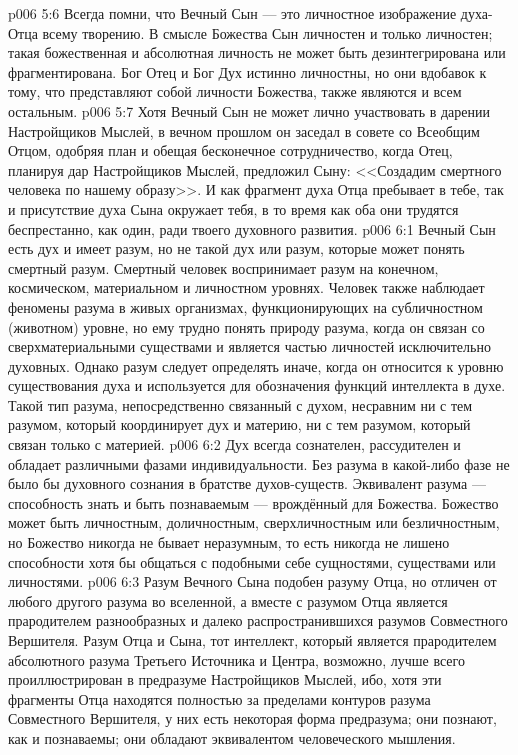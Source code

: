 \vs p006 5:6 Всегда помни, что Вечный Сын --- это личностное изображение духа\hyp{}Отца всему творению. В смысле Божества Сын личностен и только личностен; такая божественная и абсолютная личность не может быть дезинтегрирована или фрагментирована. Бог Отец и Бог Дух истинно личностны, но они вдобавок к тому, что представляют собой личности Божества, также являются и всем остальным.
\vs p006 5:7 Хотя Вечный Сын не может лично участвовать в дарении Настройщиков Мыслей, в вечном прошлом он заседал в совете со Всеобщим Отцом, одобряя план и обещая бесконечное сотрудничество, когда Отец, планируя дар Настройщиков Мыслей, предложил Сыну: <<Создадим смертного человека по нашему образу>>. И как фрагмент духа Отца пребывает в тебе, так и присутствие духа Сына окружает тебя, в то время как оба они трудятся беспрестанно, как один, ради твоего духовного развития.
\vs p006 6:1 Вечный Сын есть дух и имеет разум, но не такой дух или разум, которые может понять смертный разум. Смертный человек воспринимает разум на конечном, космическом, материальном и личностном уровнях. Человек также наблюдает феномены разума в живых организмах, функционирующих на субличностном (животном) уровне, но ему трудно понять природу разума, когда он связан со сверхматериальными существами и является частью личностей исключительно духовных. Однако разум следует определять иначе, когда он относится к уровню существования духа и используется для обозначения функций интеллекта в духе. Такой тип разума, непосредственно связанный с духом, несравним ни с тем разумом, который координирует дух и материю, ни с тем разумом, который связан только с материей.
\vs p006 6:2 Дух всегда сознателен, рассудителен и обладает различными фазами индивидуальности. Без разума в какой\hyp{}либо фазе не было бы духовного сознания в братстве духов\hyp{}существ. Эквивалент разума --- способность знать и быть познаваемым --- врождённый для Божества. Божество может быть личностным, доличностным, сверхличностным или безличностным, но Божество никогда не бывает неразумным, то есть никогда не лишено способности хотя бы общаться с подобными себе сущностями, существами или личностями.
\vs p006 6:3 Разум Вечного Сына подобен разуму Отца, но отличен от любого другого разума во вселенной, а вместе с разумом Отца является прародителем разнообразных и далеко распространившихся разумов Совместного Вершителя. Разум Отца и Сына, тот интеллект, который является прародителем абсолютного разума Третьего Источника и Центра, возможно, лучше всего проиллюстрирован в предразуме Настройщиков Мыслей, ибо, хотя эти фрагменты Отца находятся полностью за пределами контуров разума Совместного Вершителя, у них есть некоторая форма предразума; они познают, как и познаваемы; они обладают эквивалентом человеческого мышления.
